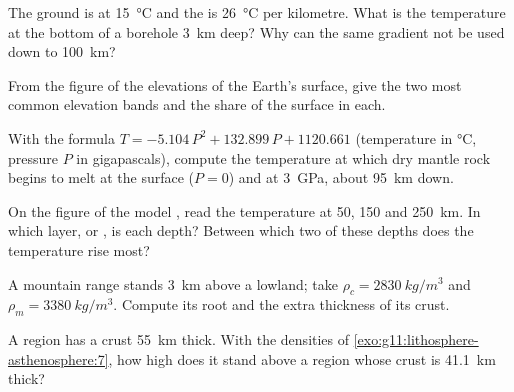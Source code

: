 \begin{exercise}[$\star$]\label{exo:g11:lithosphere-asthenosphere:3}
The ground is at \qty{15}{\celsius} and the  is
\qty{26}{\celsius} per kilometre. What is the temperature at the bottom of a
borehole \qty{3}{km} deep? Why can the same gradient not be used down to
\qty{100}{km}?
\end{exercise}

\begin{exercise}[$\star$]\label{exo:g11:lithosphere-asthenosphere:4}
From the figure of the elevations of the Earth's surface, give the two most
common elevation bands and the share of the surface in each.
\end{exercise}

\begin{exercise}[$\star$]\label{exo:g11:lithosphere-asthenosphere:5}
With the formula $T = -5.104\,P^2 + 132.899\,P + 1120.661$ (temperature in
\unit{\celsius}, pressure $P$ in gigapascals), compute the temperature at
which dry mantle rock begins to melt at the surface ($P = 0$) and at
\qty{3}{GPa}, about \qty{95}{km} down.
\end{exercise}

\begin{exercise}[$\star\star$]\label{exo:g11:lithosphere-asthenosphere:6}
On the figure of the model , read the temperature at 50, 150 and
\qty{250}{km}. In which layer,  or , is each depth?
Between which two of these depths does the temperature rise most?
\end{exercise}

\begin{exercise}[$\star\star$]\label{exo:g11:lithosphere-asthenosphere:7}
A mountain range stands \qty{3}{km} above a lowland; take $\rho_c =
\qty{2830}{kg/m^3}$ and $\rho_m = \qty{3380}{kg/m^3}$. Compute its root and
the extra thickness of its crust.
\end{exercise}

\begin{exercise}[$\star\star$]\label{exo:g11:lithosphere-asthenosphere:8}
A region has a crust \qty{55}{km} thick. With the densities of
\cref{exo:g11:lithosphere-asthenosphere:7}, how high does it stand above a
region whose crust is \qty{41.1}{km} thick?
\end{exercise}

